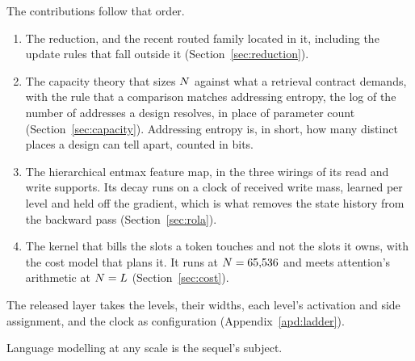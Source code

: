 The contributions follow that order.
\begin{enumerate}\setlength{\itemsep}{1pt}\setlength{\parskip}{0pt}
\item The reduction, and the recent routed family located in it, including the update rules that fall outside it (Section~\ref{sec:reduction}).
\item The capacity theory that sizes $N$ against what a retrieval contract demands, with the rule that a comparison matches addressing entropy, the log of the number of addresses a design resolves, in place of parameter count (Section~\ref{sec:capacity}). Addressing entropy is, in short, how many distinct places a design can tell apart, counted in bits.
\item The hierarchical entmax feature map, in the three wirings of its read and write supports. Its decay runs on a clock of received write mass, learned per level and held off the gradient, which is what removes the state history from the backward pass (Section~\ref{sec:rola}).
\item The kernel that bills the slots a token touches and not the slots it owns, with the cost model that plans it. It runs at $N = 65{,}536$ and meets attention's arithmetic at $N = L$ (Section~\ref{sec:cost}).
\end{enumerate}

The released layer takes the levels, their widths, each level's activation and side assignment, and the clock as configuration (Appendix~\ref{apd:ladder}).

Language modelling at any scale is the sequel's subject.

